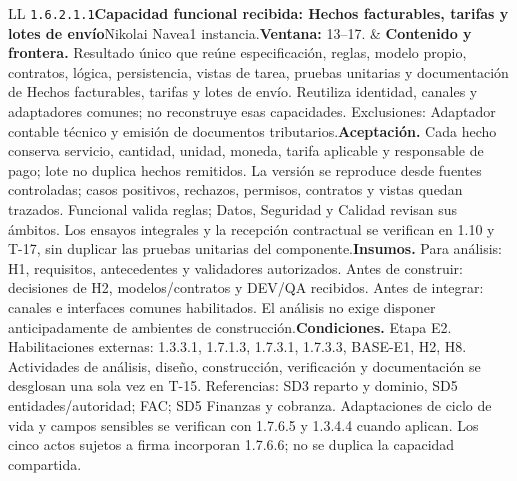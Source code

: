 \begin{longtable}{L{\tabcolsep\relax}L{\tabcolsep\relax}}
\texttt{1.\allowbreak{}6.\allowbreak{}2.\allowbreak{}1.\allowbreak{}1}\newline{}\textbf{Capacidad funcional recibida: Hechos facturables, tarifas y lotes de envío}\newline{}Nikolai Navea\newline{}1 instancia.\newline{}\textbf{Ventana:} 13--17. & \textbf{Contenido y frontera.} Resultado único que reúne especificación, reglas, modelo propio, contratos, lógica, persistencia, vistas de tarea, pruebas unitarias y documentación de Hechos facturables, tarifas y lotes de envío. Reutiliza identidad, canales y adaptadores comunes; no reconstruye esas capacidades. Exclusiones: Adaptador contable técnico y emisión de documentos tributarios.\newline{}\textbf{Aceptación.} Cada hecho conserva servicio, cantidad, unidad, moneda, tarifa aplicable y responsable de pago; lote no duplica hechos remitidos. La versión se reproduce desde fuentes controladas; casos positivos, rechazos, permisos, contratos y vistas quedan trazados. Funcional valida reglas; Datos, Seguridad y Calidad revisan sus ámbitos. Los ensayos integrales y la recepción contractual se verifican en 1.10 y T-17, sin duplicar las pruebas unitarias del componente.\newline{}\textbf{Insumos.} Para análisis: H1, requisitos, antecedentes y validadores autorizados. Antes de construir: decisiones de H2, modelos/contratos y DEV/QA recibidos. Antes de integrar: canales e interfaces comunes habilitados. El análisis no exige disponer anticipadamente de ambientes de construcción.\newline{}\textbf{Condiciones.} Etapa E2. Habilitaciones externas: 1.3.3.1, 1.7.1.3, 1.7.3.1, 1.7.3.3, BASE-E1, H2, H8. Actividades de análisis, diseño, construcción, verificación y documentación se desglosan una sola vez en T-15. Referencias: SD3 reparto y dominio, SD5 entidades/autoridad; FAC; SD5 Finanzas y cobranza. Adaptaciones de ciclo de vida y campos sensibles se verifican con 1.7.6.5 y 1.3.4.4 cuando aplican. Los cinco actos sujetos a firma incorporan 1.7.6.6; no se duplica la capacidad compartida.\\\hline

\end{longtable}
